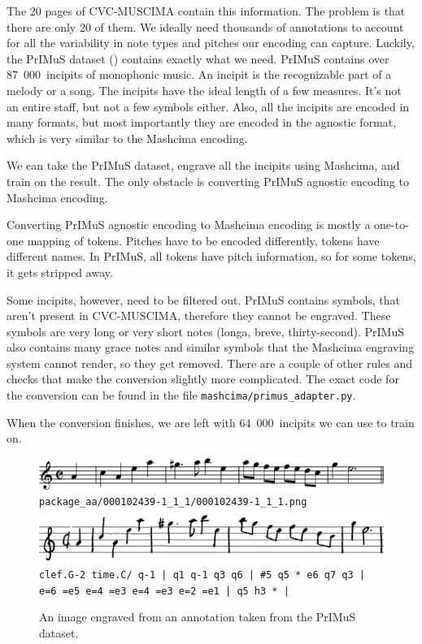 The 20 pages of CVC-MUSCIMA contain this information. The problem is that there are only 20 of them. We ideally need thousands of annotations to account for all the variability in note types and pitches our encoding can capture. Luckily, the PrIMuS dataset (\cite{Primus}) contains exactly what we need. PrIMuS contains over 87~000~incipits of monophonic music. An incipit is the recognizable part of a melody or a song. The incipits have the ideal length of a few measures. It's not an entire staff, but not a few symbols either. Also, all the incipits are encoded in many formats, but most importantly they are encoded in the agnostic format, which is very similar to the Mashcima encoding.

We can take the PrIMuS dataset, engrave all the incipits using Mashcima, and train on the result. The only obstacle is converting PrIMuS agnostic encoding to Mashcima encoding.

Converting PrIMuS agnostic encoding to Mashcima encoding is mostly a one-to-one mapping of tokens. Pitches have to be encoded differently, tokens have different names. In PrIMuS, all tokens have pitch information, so for some tokens, it gets stripped away.

Some incipits, however, need to be filtered out. PrIMuS contains symbols, that aren't present in CVC-MUSCIMA, therefore they cannot be engraved. These symbols are very long or very short notes (longa, breve, thirty-second). PrIMuS also contains many grace notes and similar symbols that the Mashcima engraving system cannot render, so they get removed. There are a couple of other rules and checks that make the conversion slightly more complicated. The exact code for the conversion can be found in the file \verb`mashcima/`\allowbreak\verb`primus_`\allowbreak\verb`adapter.py`.

When the conversion finishes, we are left with 64~000~incipits we can use to train on.

\begin{figure}[h]
    \centering
    \includegraphics[width=140mm]{../img/primus-incipit-2}
    \verb`package_aa/000102439-1_1_1/000102439-1_1_1.png`
    \includegraphics[width=140mm]{../img/primus-incipit-2-engraved}
    \verb`clef.G-2 time.C/ q-1 | q1 q-1 q3 q6 | #5 q5 * e6 q7 q3 |`
    \verb`e=6 =e5 e=4 =e3 e=4 =e3 e=2 =e1 | q5 h3 * |`
    \caption{An image engraved from an annotation taken from the PrIMuS dataset.}
    \label{fig6:PrimusIncipit}
\end{figure}

